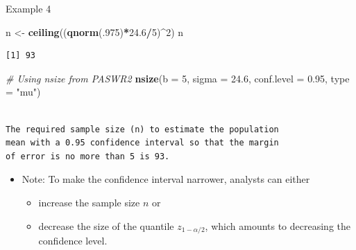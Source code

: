 \documentclass[
  ignorenonframetext,
]{beamer}
\newenvironment{Shaded}{\begin{snugshade}}{\end{snugshade}}
\newcommand{\AttributeTok}[1]{\textcolor[rgb]{0.13,0.29,0.53}{#1}}
\newcommand{\CommentTok}[1]{\textcolor[rgb]{0.56,0.35,0.01}{\textit{#1}}}
\newcommand{\DecValTok}[1]{\textcolor[rgb]{0.00,0.00,0.81}{#1}}
\newcommand{\FloatTok}[1]{\textcolor[rgb]{0.00,0.00,0.81}{#1}}
\newcommand{\FunctionTok}[1]{\textcolor[rgb]{0.13,0.29,0.53}{\textbf{#1}}}
\newcommand{\NormalTok}[1]{#1}
\newcommand{\OtherTok}[1]{\textcolor[rgb]{0.56,0.35,0.01}{#1}}
\newcommand{\SpecialCharTok}[1]{\textcolor[rgb]{0.81,0.36,0.00}{\textbf{#1}}}
\newcommand{\StringTok}[1]{\textcolor[rgb]{0.31,0.60,0.02}{#1}}
\providecommand{\tightlist}{%
  \setlength{\itemsep}{0pt}\setlength{\parskip}{0pt}}
\begin{document}
\begin{frame}[fragile]{Example 4}
\label{example-4-1}
\normalsize

\begin{Shaded}
\begin{Highlighting}[]
\NormalTok{n }\OtherTok{\textless{}{-}} \FunctionTok{ceiling}\NormalTok{((}\FunctionTok{qnorm}\NormalTok{(.}\DecValTok{975}\NormalTok{)}\SpecialCharTok{*}\FloatTok{24.6}\SpecialCharTok{/}\DecValTok{5}\NormalTok{)}\SpecialCharTok{\^{}}\DecValTok{2}\NormalTok{)}
\NormalTok{n}
\end{Highlighting}
\end{Shaded}

\begin{verbatim}
[1] 93
\end{verbatim}

\begin{Shaded}
\begin{Highlighting}[]
\CommentTok{\# Using nsize from PASWR2}
\FunctionTok{nsize}\NormalTok{(}\AttributeTok{b =} \DecValTok{5}\NormalTok{, }\AttributeTok{sigma =} \FloatTok{24.6}\NormalTok{, }\AttributeTok{conf.level =} \FloatTok{0.95}\NormalTok{, }\AttributeTok{type =} \StringTok{"mu"}\NormalTok{)}
\end{Highlighting}
\end{Shaded}

\begin{verbatim}

The required sample size (n) to estimate the population 
mean with a 0.95 confidence interval so that the margin 
of error is no more than 5 is 93.
\end{verbatim}

\normalsize

\begin{itemize}
\item
  Note: To make the confidence interval narrower, analysts can either

  \begin{itemize}
  \tightlist
  \item
    increase the sample size \(n\) or
  \item
    decrease the size of the quantile \(z_{1-\alpha/2}\), which amounts
    to decreasing the confidence level.
  \end{itemize}
\end{itemize}
\end{frame}
\end{document}
